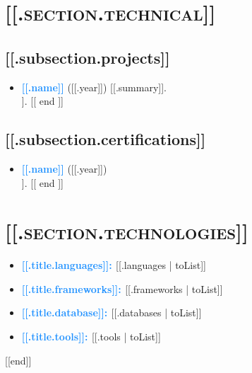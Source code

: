 \documentclass[10pt,a4paper,sans]{moderncv}        %
\begin{document}
\section{\textsc{[[.section.technical]]}}
\vspace{-2pt}
\subsection{[[.subsection.projects]]}
\vspace{3pt}
\begin{itemize}
  [[ range .projects ]]
  \item{\textbf{\textcolor{dodgerblue}{[[.name]]}} \textcolor{dartmouthgreen}{([[.year]])} [[.summary]]}.
        \\ [[.description]].
        [[ end ]]
\end{itemize}

\subsection{[[.subsection.certifications]]}
\vspace{3pt}
\begin{itemize}
  [[ range .certifications ]]
  \item{\textbf{\textcolor{dodgerblue}{[[.name]]}} \textcolor{dartmouthgreen}{([[.year]])}}\\[[.description]].
        [[ end ]]
\end{itemize}

\section{\textsc{[[.section.technologies]]}}
\begin{itemize}[[with .technologies]]
  \item \textbf{\textcolor{dodgerblue}{[[.title.languages]]: }} [[.languages | toList]]
  \item \textbf{\textcolor{dodgerblue}{[[.title.frameworks]]: }} [[.frameworks | toList]]
  \item \textbf{\textcolor{dodgerblue}{[[.title.database]]: }} [[.databases | toList]]
  \item \textbf{\textcolor{dodgerblue}{[[.title.tools]]: }} [[.tools | toList]]
\end{itemize}[[end]]
\end{document}
